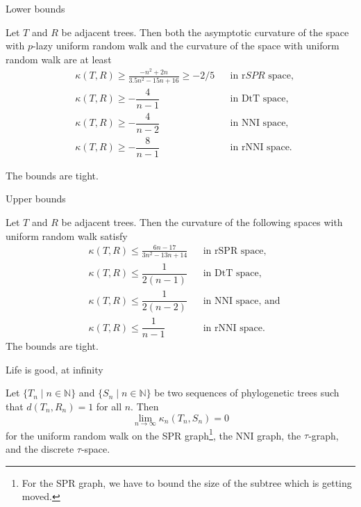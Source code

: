 \documentclass{beamer}
\newcommand{\nni}{\mathrm{NNI}}
\newcommand{\rnni}{\mathrm{rNNI}}
\newcommand{\mdts}{\mathrm{DtT}}
\theoremstyle{example}
\begin{document}
\begin{frame}{Lower bounds}
\begin{theorem}
Let $T$ and $R$ be adjacent trees.
Then both the asymptotic curvature of the space with $p$-lazy uniform random walk and the curvature of the space with uniform random walk are at least 
\begin{align*}
& \kappa(T,R) \geq \frac{-n^2 + 2n}{3.5n^2 - 15n + 16} \geq -2/5	&& \mbox{in $\mathrm rSPR$ space,}\\
& \kappa(T,R) \geq -\dfrac{4}{n-1}							&& \mbox{in $\mdts$ space,}\\
& \kappa(T,R) \geq -\dfrac{4}{n-2}							&& \mbox{in $\nni$ space,}\\
& \kappa(T,R) \geq -\dfrac{8}{n-1}							&& \mbox{in $\rnni$ space.}
\end{align*}

The bounds are tight.
\end{theorem}
\end{frame}

\begin{frame}{Upper bounds}
\begin{theorem}
Let $T$ and $R$ be adjacent trees.
Then the curvature of the following spaces with uniform random walk satisfy
\begin{align*}
& \kappa(T,R) \leq \frac{6n-17}{3n^2-13n+14}	&& \mbox{in $\mathrm{rSPR}$ space,}\\
& \kappa(T,R) \leq \dfrac{1}{2(n-1)}			&& \mbox{in $\mdts$ space,}\\
& \kappa(T,R) \leq \dfrac{1}{2(n-2)}			&& \mbox{in $\nni$ space, and}\\
& \kappa(T,R) \leq \dfrac{1}{n-1}				&& \mbox{in $\rnni$ space.}
\end{align*}
The bounds are tight.
\end{theorem}
\end{frame}

\begin{frame}{Life is good, at infinity}
\begin{theorem}
Let $\{T_n \mid n \in \mathbb N\}$ and $\{S_n \mid n \in \mathbb N\}$ be two sequences of phylogenetic trees such that $d(T_n,R_n) = 1$ for all $n$.
Then $$\lim_{n \rightarrow \infty} \kappa_n(T_n,S_n) = 0$$ for the uniform random walk on the SPR
graph\footnote{For the SPR graph, we have to bound the size of the subtree which is getting moved.},
the NNI graph, the $\tau$-graph, and the discrete $\tau$-space.
\end{theorem}
\end{frame}
\end{document}
